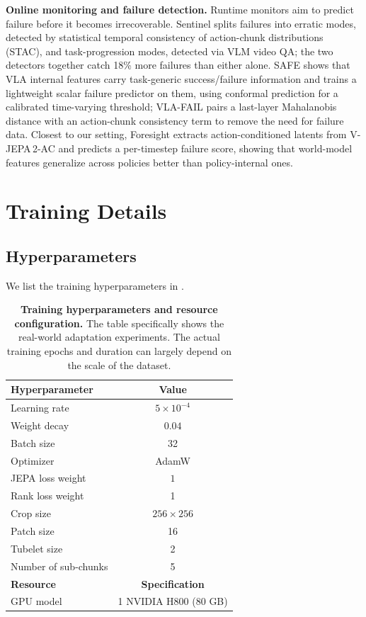 \documentclass[10pt,twocolumn,letterpaper]{article}
\begin{document}
\textbf{Online monitoring and failure detection.} Runtime monitors aim to predict failure before it becomes irrecoverable. Sentinel \citep{agia2024unpacking} splits failures into erratic modes, detected by statistical temporal consistency of action-chunk distributions (STAC), and task-progression modes, detected via VLM video QA; the two detectors together catch 18\% more failures than either alone. SAFE \citep{gu2026safe} shows that VLA internal features carry task-generic success/failure information and trains a lightweight scalar failure predictor on them, using conformal prediction for a calibrated time-varying threshold; VLA-FAIL \citep{seligmann2026vla} pairs a last-layer Mahalanobis distance with an action-chunk consistency term to remove the need for failure data. Closest to our setting, Foresight \citep{zhang2026foresight} extracts action-conditioned latents from V-JEPA\,2-AC and predicts a per-timestep failure score, showing that world-model features generalize across policies better than policy-internal ones.

\section{Training Details}
\subsection{Hyperparameters}
We list the training hyperparameters in .

\begin{table}[htbp]
\centering

\caption{\textbf{Training hyperparameters and resource configuration.} The table specifically shows the real-world adaptation experiments. The actual training epochs and duration can largely depend on the scale of the dataset.}
\label{tab:hyperparams}
\begin{tabular}{lc}
\hline
\textbf{Hyperparameter} & \textbf{Value} \\
\hline
Learning rate & $5 \times 10^{-4}$ \\
Weight decay & $0.04$ \\
Batch size & 32 \\

Optimizer & AdamW \\
JEPA loss weight & $1$ \\
Rank loss weight & 1 \\
Crop size & $256 \times 256$ \\
Patch size & 16  \\
Tubelet size & 2\\
Number of sub-chunks & 5 \\

\hline
\textbf{Resource} & \textbf{Specification} \\
\hline
GPU model & 1 NVIDIA H800 (80 GB) \\
\hline
\end{tabular}



\end{table}
\end{document}
